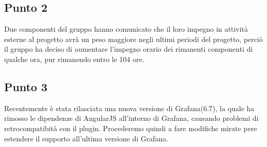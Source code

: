     \subsection{Punto 2}
    Due componenti del gruppo hanno comunicato che il loro impegno in attività esterne al progetto avrà un peso maggiore negli ultimi periodi del progetto, perciò il gruppo ha deciso di aumentare l'impegno orario dei rimanenti componenti di qualche ora, pur rimanendo entro le 104 ore.
    \subsection{Punto 3}
    Recentemente è stata rilasciata una nuova versione di Grafana\glosp (6.7), la quale ha rimosso le dipendenze di AngularJS all'interno di Grafana\glo, causando problemi di retrocompatibità con il plugin. Procederemo quindi a fare modifiche mirate pere estendere il supporto all'ultima versione di Grafana\glo.
